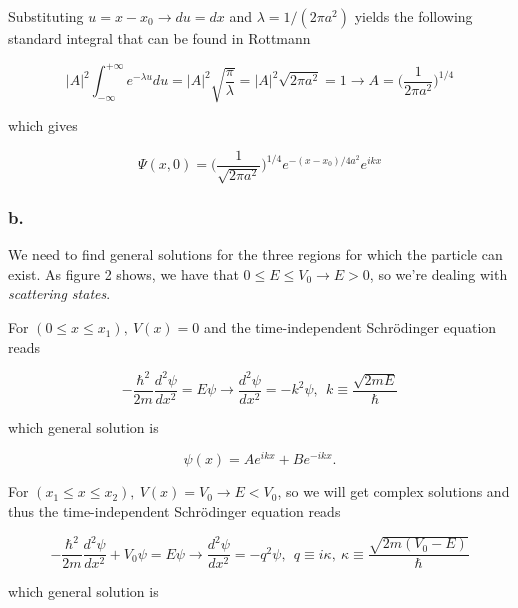 \documentclass{article}
\begin{document}
Substituting $u = x-x_0 \rightarrow du = dx$ and $\lambda = 1/(2\pi a^2)$ yields the following standard integral that can be found in Rottmann

\begin{equation}
|A|^2\int_{-\infty}^{+\infty} e^{-\lambda u} du = |A|^2\sqrt{\frac{\pi}{\lambda}} = |A|^2\sqrt{2\pi a^2} = 1 \rightarrow A = \bigg(\frac{1}{2\pi a^2}\bigg)^{1/4}
\end{equation}

which gives 

\begin{equation}
\Psi(x, 0) = \bigg(\frac{1}{\sqrt{2\pi a^2}}\bigg)^{1/4}e^{-(x-x_0)/4a^2}e^{ikx}
\end{equation}



\subsubsection*{b.}

We need to find general solutions for the three regions for which the particle can exist. As figure 2 shows, we have that $0 \leq E \leq V_0 \rightarrow E > 0$, so we're dealing with \textit{scattering states}.

\bigskip

For $(0 \leq x \leq x_1), \ V(x) = 0$ and the time-independent Schrödinger equation reads

\begin{equation}
-\frac{\hbar^2}{2m}\frac{d^2\psi}{dx^2} = E\psi \rightarrow \frac{d^2\psi}{dx^2} = -k^2\psi, \ \ k \equiv \frac{\sqrt{2mE}}{\hbar}
\end{equation}

which general solution is

\begin{equation}
\psi(x) = Ae^{ikx} + Be^{-ikx}.
\end{equation}

For $(x_1 \leq x \leq x_2), \ V(x) = V_0 \rightarrow E < V_0$, so we will get complex solutions and thus the time-independent Schrödinger equation reads

\begin{equation}
-\frac{\hbar^2}{2m}\frac{d^2\psi}{dx^2} + V_0\psi = E\psi \rightarrow \frac{d^2\psi}{dx^2} = -q^2\psi, \ \ q \equiv i\kappa, \ \kappa \equiv \frac{\sqrt{2m(V_0 - E)}}{\hbar}
\end{equation}

which general solution is
\end{document}
